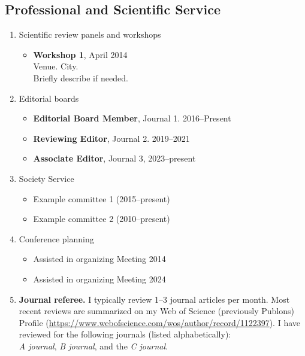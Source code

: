 \subsection{Professional and Scientific Service}

\begin{enumerate}


\item Scientific review panels and workshops 
  \begin{itemize}
  \item \textbf{Workshop 1},
    April 2014 \\
    Venue.
    City.\\
    Briefly describe if needed.
  \end{itemize}
  
\item Editorial boards

  \begin{itemize}
  \item \textbf{Editorial Board Member}, Journal 1.  2016--Present
  \item \textbf{Reviewing Editor}, Journal 2.
    2019--2021\label{ERed}
  \item \textbf{Associate Editor}, Journal 3, 2023--present\label{jfwm}
  \end{itemize}

\item Society Service 

  \begin{itemize}
  \item Example committee 1 (2015--present)
  \item Example committee 2 (2010--present)
  \end{itemize}

\item Conference planning

  \begin{itemize}
  \item Assisted in organizing Meeting 2014
  \item Assisted in organizing Meeting 2024
  \end{itemize}
  
\item \textbf{Journal referee.} I typically review 1--3 journal
  articles per month.
  Most recent reviews are summarized on my Web of Science (previously
  Publons) Profile
  (\url{https://www.webofscience.com/wos/author/record/1122397}).
  I have reviewed for the following journals (listed
  alphabetically):\\
  \textit{A journal},
  \textit{B journal},
  and the \textit{C journal}.
\end{enumerate}

